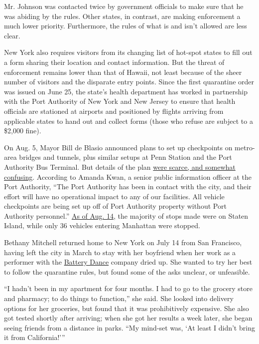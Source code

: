 Mr. Johnson was contacted twice by government officials to make sure
that he was abiding by the rules. Other states, in contrast, are making
enforcement a much lower priority. Furthermore, the rules of what is and
isn't allowed are less clear.

New York also requires visitors from its changing list of hot-spot
states to fill out a form sharing their location and contact
information. But the threat of enforcement remains lower than that of
Hawaii, not least because of the sheer number of visitors and the
disparate entry points. Since the first quarantine order was issued on
June 25, the state's health department has worked in partnership with
the Port Authority of New York and New Jersey to ensure that health
officials are stationed at airports and positioned by flights arriving
from applicable states to hand out and collect forms (those who refuse
are subject to a \$2,000 fine).

On Aug. 5, Mayor Bill de Blasio announced plans to set up checkpoints on
metro-area bridges and tunnels, plus similar setups at Penn Station and
the Port Authority Bus Terminal. But details of the plan
\href{https://www.nytimes3xbfgragh.onion/2020/08/05/nyregion/nyc-coronavirus-quarantine-checkpoints.html}{were
scarce, and somewhat confusing}. According to Amanda Kwan, a senior
public information officer at the Port Authority, ``The Port Authority
has been in contact with the city, and their effort will have no
operational impact to any of our facilities. All vehicle checkpoints are
being set up off of Port Authority property without Port Authority
personnel.''
\href{https://www.nbcnewyork.com/news/local/most-of-nycs-coronavirus-checkpoints-stops-have-taken-place-in-one-borough/2567143/}{As
of Aug. 14}, the majority of stops made were on Staten Island, while
only 36 vehicles entering Manhattan were stopped.

Bethany Mitchell returned home to New York on July 14 from San
Francisco, having left the city in March to stay with her boyfriend when
her work as a performer with the
\href{https://batterydance.org/}{Battery Dance} company dried up. She
wanted to try her best to follow the quarantine rules, but found some of
the asks unclear, or unfeasible.

``I hadn't been in my apartment for four months. I had to go to the
grocery store and pharmacy; to do things to function,'' she said. She
looked into delivery options for her groceries, but found that it was
prohibitively expensive. She also got tested shortly after arriving;
when she got her results a week later, she began seeing friends from a
distance in parks. ``My mind-set was, `At least I didn't bring it from
California!'''

